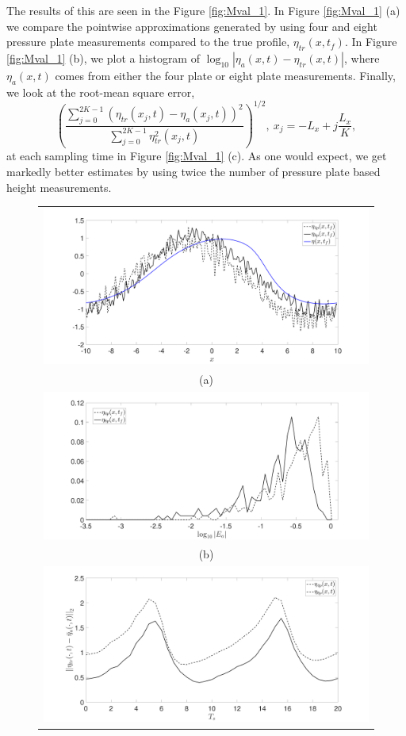 The results of this are seen in the Figure \ref{fig:Mval_1}.  In Figure \ref{fig:Mval_1} (a) we compare the pointwise approximations generated by using four and eight pressure plate measurements compared to the true profile, $\eta_{tr}(x,t_{f})$.  In Figure \ref{fig:Mval_1} (b), we plot a histogram of $\log_{10}|\eta_{a}(x,t) - \eta_{tr}(x,t)|$, where $\eta_{a}(x,t)$ comes from either the four plate or eight plate measurements.  Finally, we look at the root-mean square error, 
\[
\left(\frac{\sum_{j=0}^{2K-1} \left( \eta_{tr}(x_{j},t) - \eta_{a}(x_{j},t) \right)^{2}}{\sum_{j=0}^{2K-1}\eta_{tr}^{2}(x_{j},t)}\right)^{1/2}, ~ x_{j} = -L_{x} + j\frac{L_{x}}{K},
\]
at each sampling time in Figure \ref{fig:Mval_1} (c).  As one would expect, we get markedly better estimates by using twice the number of pressure plate based height measurements.  
\begin{figure}
\centering
\begin{tabular}{c}
\includegraphics[width=.95\textwidth]{Images/wave_tf_20_sig_pt1_4_vs8pplates_Mval_1} \\
(a)\\
\includegraphics[width=.95\textwidth]{Images/histogram_tf_20_sig_pt1_4_vs8pplates_Mval_1}\\
(b)\\
\includegraphics[width=.95\textwidth]{Images/rmserr_tf_20_sig_pt1_4_vs8pplates_Mval_1}\\

\end{tabular}
\end{figure}
